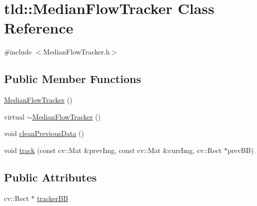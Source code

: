 \hypertarget{classtld_1_1_median_flow_tracker}{
\section{tld::MedianFlowTracker Class Reference}
\label{classtld_1_1_median_flow_tracker}
}


{\ttfamily \#include $<$MedianFlowTracker.h$>$}

\subsection*{Public Member Functions}
\begin{DoxyCompactItemize}
\item 
\hyperlink{classtld_1_1_median_flow_tracker_a10af34f4759e504cce93662c11714d7e}{MedianFlowTracker} ()
\item 
virtual \hyperlink{classtld_1_1_median_flow_tracker_a604feb65f62399c68b84ec5a981e528a}{$\sim$MedianFlowTracker} ()
\item 
void \hyperlink{classtld_1_1_median_flow_tracker_ad5c1599acad1607c20c7d2ca8aacf56c}{cleanPreviousData} ()
\item 
void \hyperlink{classtld_1_1_median_flow_tracker_addcc103122a93f098583b8f9cf72e8ff}{track} (const cv::Mat \&prevImg, const cv::Mat \&currImg, cv::Rect $\ast$prevBB)
\end{DoxyCompactItemize}
\subsection*{Public Attributes}
\begin{DoxyCompactItemize}
\item 
cv::Rect $\ast$ \hyperlink{classtld_1_1_median_flow_tracker_a254c6f56a5b4567357321acc5a36b844}{trackerBB}
\end{DoxyCompactItemize}


